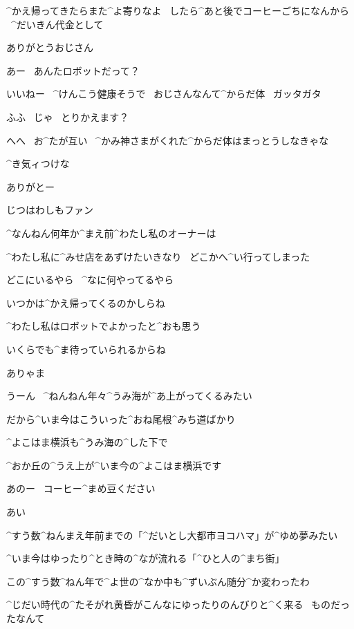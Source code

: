 \page[14]
\Ojisan ^{かえ}{帰}ってきたらまた^{よ}{寄}りなよ
\ したら^{あと}{後}でコーヒーごちになんから
\ ^{だいきん}{代金}として

\Alpha ありがとうおじさん

\Ojisan あー
\ あんたロボットだって？

\Ojisan いいねー
\ ^{けんこう}{健康}そうで
\ おじさんなんて^{からだ}{体}
\ ガッタガタ

\Alpha ふふ
\ じゃ
\ とりかえます？

\page[15]
\Ojisan へへ
\ お^{たが}{互}い
\ ^{かみ}{神}さまがくれた^{からだ}{体}はまっとうしなきゃな

\Ojisan ^{き}{気}ィつけな

\Alpha ありがとー

\Ojisan じつはわしもファン

\page[16]
\Alpha ^{なんねん}{何年}か^{まえ}{前}^{わたし}{私}のオーナーは

\Alpha ^{わたし}{私}に^{みせ}{店}をあずけたいきなり
\ どこかへ^{い}{行}ってしまった

\Alpha どこにいるやら
\ ^{なに}{何}やってるやら

\Alpha いつかは^{かえ}{帰}ってくるのかしらね

\Alpha ^{わたし}{私}はロボットでよかったと^{おも}{思}う

\Alpha いくらでも^{ま}{待}っていられるからね

\page[18]
\Alpha ありゃま

\Alpha うーん
\ ^{ねんねん}{年々}^{うみ}{海}が^{あ}{上}がってくるみたい

\page[19]
\Alpha だから^{いま}{今}はこういった^{おね}{尾根}^{みち}{道}ばかり

\page[20]
\Alpha ^{よこはま}{横浜}も^{うみ}{海}の^{した}{下}で

\Alpha ^{おか}{丘}の^{うえ}{上}が^{いま}{今}の^{よこはま}{横浜}です

\page[22]
\Alpha あのー
\ コーヒー^{まめ}{豆}ください

\Person あい

\Alpha ^{すう}{数}^{ねんまえ}{年前}までの「^{だいとし}{大都市}ヨコハマ」が^{ゆめ}{夢}みたい

\Alpha ^{いま}{今}はゆったり^{とき}{時}の^{なが}{流}れる「^{ひと}{人}の^{まち}{街}」

\page[23]
\Alpha この^{すう}{数}^{ねん}{年}で^{よ}{世}の^{なか}{中}も^{ずいぶん}{随分}^{か}{変}わったわ

\Alpha ^{じだい}{時代}の^{たそがれ}{黄昏}がこんなにゆったりのんびりと^{く}{来}る
\ ものだったなんて

